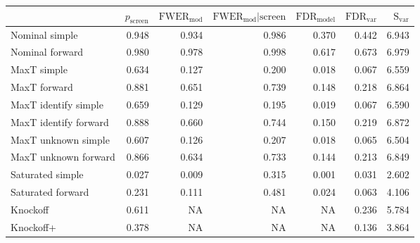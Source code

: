 
\renewcommand{\guarantee}[1]{{\color{blue} #1}}
\begin{tabular}{lrrrrrr}
\toprule
{} &  $p_{\text{screen}}$ &  $\text{FWER}_{\text{mod}}$ &  $\text{FWER}_{\text{mod}} \vert \text{screen}$ &  $\text{FDR}_{\text{model}}$ &  $\text{FDR}_{\text{var}}$ &  $\text{S}_{\text{var}}$ \\ \midrule
Nominal simple & 0.948 & 0.934 & 0.986 & 0.370 & 0.442 & 6.943 \\ 
Nominal forward & 0.980 & 0.978 & 0.998 & 0.617 & 0.673 & 6.979 \\ 
MaxT simple & 0.634 & \guarantee{0.127} & \guarantee{0.200} & \guarantee{0.018} & 0.067 & 6.559 \\ 
MaxT forward & 0.881 & 0.651 & 0.739 & \guarantee{0.148} & 0.218 & 6.864 \\ 
MaxT identify simple & 0.659 & \guarantee{0.129} & \guarantee{0.195} & \guarantee{0.019} & 0.067 & 6.590 \\ 
MaxT identify forward & 0.888 & 0.660 & 0.744 & \guarantee{0.150} & 0.219 & 6.872 \\ 
MaxT unknown simple & 0.607 & \guarantee{0.126} & \guarantee{0.207} & \guarantee{0.018} & 0.065 & 6.504 \\ 
MaxT unknown forward & 0.866 & 0.634 & 0.733 & \guarantee{0.144} & 0.213 & 6.849 \\ 
Saturated simple & 0.027 & 0.009 & 0.315 & 0.001 & 0.031 & 2.602 \\ 
Saturated forward & 0.231 & 0.111 & 0.481 & 0.024 & 0.063 & 4.106 \\ 
Knockoff & 0.611 & NA & NA & NA & 0.236 & 5.784 \\ 
Knockoff+ & 0.378 & NA & NA & NA & \guarantee{0.136} & 3.864 \\  
\bottomrule
\end{tabular}
